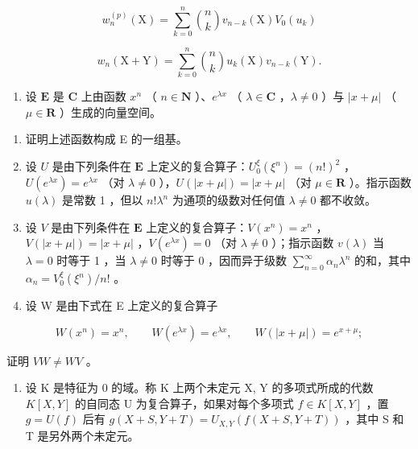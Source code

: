 \[
w _ {n} ^ {(p)} (\mathrm{X}) = \sum_ {k = 0} ^ {n} \binom {n} {k} v _ {n - k} (\mathrm{X}) V _ {0} (u _ {k})
\]

\[
w _ {n} (\mathrm{X} + \mathrm{Y}) = \sum_ {k = 0} ^ {n} \binom {n} {k} u _ {k} (\mathrm{X}) v _ {n - k} (\mathrm{Y}).
\]

\begin{enumerate}
\def\labelenumi{\arabic{enumi})}
\setcounter{enumi}{1}
\tightlist
\item
  设 \(\mathbf{E}\) 是 \(\mathbf{C}\) 上由函数 \(x^n\) （ \(n \in \mathbf{N}\) ）、\(e^{\lambda x}\) （ \(\lambda \in \mathbf{C}\) ，\(\lambda \neq 0\) ）与 \(|x + \mu|\) （ \(\mu \in \mathbf{R}\) ）生成的向量空间。
\end{enumerate}

\begin{enumerate}
\def\labelenumi{\alph{enumi})}
\item
  证明上述函数构成 E 的一组基。
\item
  设 \(U\) 是由下列条件在 \(\mathbf{E}\) 上定义的复合算子：\(U_0^\xi (\xi^n) = (n!)^2\) ，\(U(e^{\lambda x}) = e^{\lambda x}\) （对 \(\lambda \neq 0\) ），\(U(|x + \mu|) = |x + \mu|\) （对 \(\mu \in \mathbf{R}\) ）。指示函数 \(u(\lambda)\) 是常数 1 ，但以 \(n!\lambda^n\) 为通项的级数对任何值 \(\lambda \neq 0\) 都不收敛。
\item
  设 \(V\) 是由下列条件在 \(\mathbf{E}\) 上定义的复合算子：\(V(x^n) = x^n\) ，\(V(|x + \mu|) = |x + \mu|\) ，\(V(e^{\lambda x}) = 0\) （对 \(\lambda \neq 0\) ）；指示函数 \(v(\lambda)\) 当 \(\lambda = 0\) 时等于 1 ，当 \(\lambda \neq 0\) 时等于 0 ，因而异于级数 \(\sum_{n=0}^{\infty} \alpha_n \lambda^n\) 的和，其中 \(\alpha_n = V_0^\xi(\xi^n)/n!\) 。
\item
  设 W 是由下式在 E 上定义的复合算子
\end{enumerate}

\[
W (x ^ {n}) = x ^ {n}, \qquad W (e ^ {\lambda x}) = e ^ {\lambda x}, \qquad W (| x + \mu |) = e ^ {x + \mu};
\]

证明 \(VW \neq WV\) 。

\begin{enumerate}
\def\labelenumi{\arabic{enumi})}
\setcounter{enumi}{2}
\tightlist
\item
  设 K 是特征为 0 的域。称 K 上两个未定元 X, Y 的多项式所成的代数 \(K[X,Y]\) 的自同态 U 为复合算子，如果对每个多项式 \(f \in K[X,Y]\) ，置 \(g = U(f)\) 后有 \(g(X + S, Y + T) = U_{X,Y}(f(X + S, Y + T))\) ，其中 S 和 T 是另外两个未定元。
\end{enumerate}

